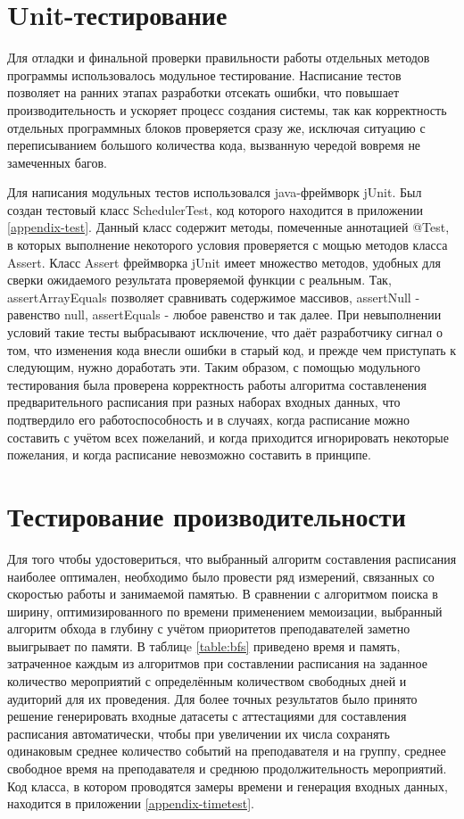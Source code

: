 \section{Unit-тестирование} \label{ch4:sec2}

Для отладки и финальной проверки правильности работы отдельных методов программы использовалось модульное тестирование. Насписание тестов позволяет на ранних этапах разработки отсекать ошибки, что повышает производительность и ускоряет процесс создания системы, так как корректность отдельных программных блоков проверяется сразу же, исключая ситуацию с переписыванием большого количества кода, вызванную чередой вовремя не замеченных багов.

Для написания модульных тестов использовался java-фреймворк jUnit. Был создан тестовый класс SchedulerTest, код которого находится в приложении \ref{appendix-test}. Данный класс содержит методы, помеченные аннотацией @Test, в которых выполнение некоторого условия проверяется с мощью методов класса Assert. Класс Assert фреймворка jUnit имеет множество методов, удобных для сверки ожидаемого результата проверяемой функции с реальным. Так, assertArrayEquals позволяет сравнивать содержимое массивов, assertNull - равенство null, assertEquals - любое равенство и так далее. При невыполнении условий такие тесты выбрасывают исключение, что даёт разработчику сигнал о том, что изменения кода внесли ошибки в старый код, и прежде чем приступать к следующим, нужно доработать эти. Таким образом, с помощью модульного тестирования была проверена корректность работы алгоритма составленения предварительного расписания при разных наборах входных данных, что подтвердило его работоспособность и в случаях, когда расписание можно составить с учётом всех пожеланий, и когда приходится игнорировать некоторые пожелания, и когда расписание невозможно составить в принципе. 

\section{Тестирование производительности} \label{ch4:sec3}
Для того чтобы удостовериться, что выбранный алгоритм составления расписания наиболее оптимален, необходимо было провести ряд измерений, связанных со скоростью работы и занимаемой памятью. В сравнении с алгоритмом поиска в ширину, оптимизированного по времени применением мемоизации, выбранный алгоритм обхода в глубину с учётом приоритетов преподавателей заметно выигрывает по памяти. В таблицe \ref{table:bfs} приведено время и память, затраченное каждым из алгоритмов при составлении расписания на заданное количество мероприятий с определённым количеством свободных дней и аудиторий для их проведения. Для более точных результатов было принято решение генерировать входные датасеты с аттестациями для составления расписания автоматически, чтобы при увеличении их числа сохранять одинаковым среднее количество событий на преподавателя и на группу, среднее свободное время на преподавателя и среднюю продолжительность мероприятий. Код класса, в котором проводятся замеры времени и генерация входных данных, находится в приложении \ref{appendix-timetest}.

